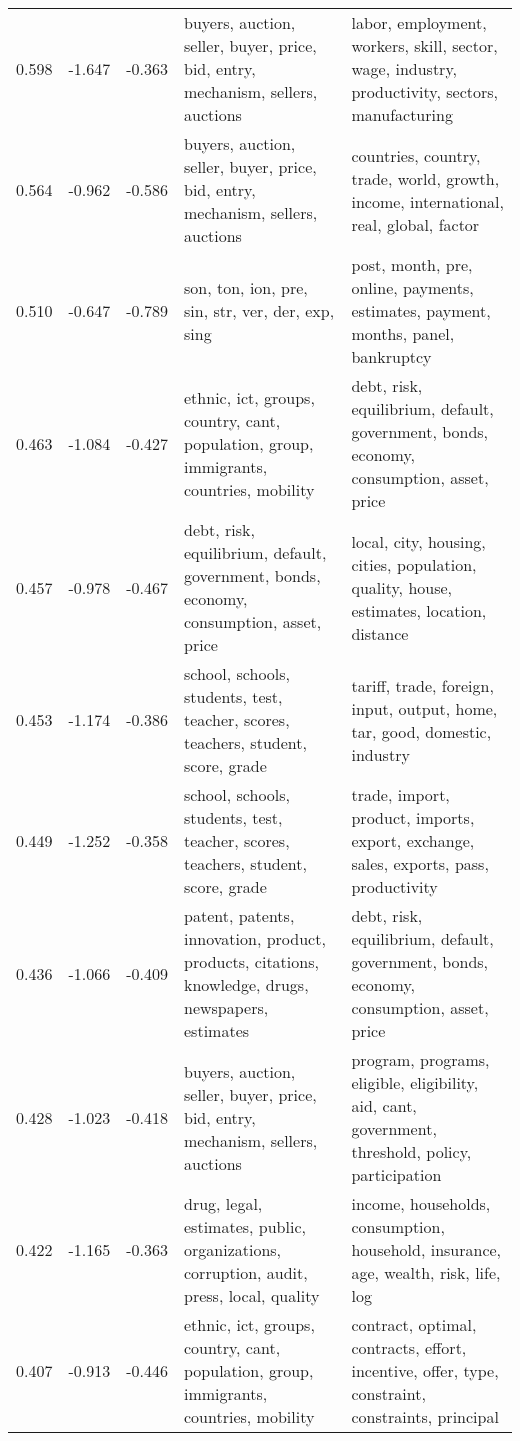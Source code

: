 \begin{tabular}{cccp{5cm}p{5cm}}
0.598 & -1.647 & -0.363 & buyers, auction, seller, buyer, price, bid, entry, mechanism, sellers, auctions & labor, employment, workers, skill, sector, wage, industry, productivity, sectors, manufacturing \\
0.564 & -0.962 & -0.586 & buyers, auction, seller, buyer, price, bid, entry, mechanism, sellers, auctions & countries, country, trade, world, growth, income, international, real, global, factor \\
0.510 & -0.647 & -0.789 & son, ton, ion, pre, sin, str, ver, der, exp, sing & post, month, pre, online, payments, estimates, payment, months, panel, bankruptcy \\
0.463 & -1.084 & -0.427 & ethnic, ict, groups, country, cant, population, group, immigrants, countries, mobility & debt, risk, equilibrium, default, government, bonds, economy, consumption, asset, price \\
0.457 & -0.978 & -0.467 & debt, risk, equilibrium, default, government, bonds, economy, consumption, asset, price & local, city, housing, cities, population, quality, house, estimates, location, distance \\
0.453 & -1.174 & -0.386 & school, schools, students, test, teacher, scores, teachers, student, score, grade & tariff, trade, foreign, input, output, home, tar, good, domestic, industry \\
0.449 & -1.252 & -0.358 & school, schools, students, test, teacher, scores, teachers, student, score, grade & trade, import, product, imports, export, exchange, sales, exports, pass, productivity \\
0.436 & -1.066 & -0.409 & patent, patents, innovation, product, products, citations, knowledge, drugs, newspapers, estimates & debt, risk, equilibrium, default, government, bonds, economy, consumption, asset, price \\
0.428 & -1.023 & -0.418 & buyers, auction, seller, buyer, price, bid, entry, mechanism, sellers, auctions & program, programs, eligible, eligibility, aid, cant, government, threshold, policy, participation \\
0.422 & -1.165 & -0.363 & drug, legal, estimates, public, organizations, corruption, audit, press, local, quality & income, households, consumption, household, insurance, age, wealth, risk, life, log \\
0.407 & -0.913 & -0.446 & ethnic, ict, groups, country, cant, population, group, immigrants, countries, mobility & contract, optimal, contracts, effort, incentive, offer, type, constraint, constraints, principal \\

\end{tabular}
